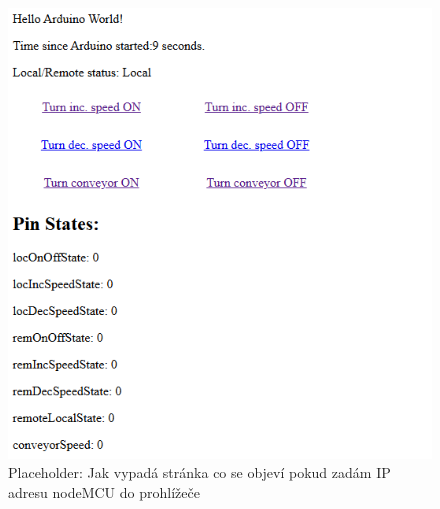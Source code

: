 \begin{figure}[H]
    \centering
    \includegraphics[width=0.8\linewidth]{images/nodeMCUlandingPage.png}
    \caption{Placeholder: Jak vypadá stránka co se objeví pokud zadám IP adresu nodeMCU do prohlížeče}
    \label{fig:NodeMCUlandingPage}
\end{figure}






